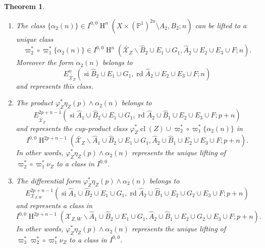 \documentclass[11pt,a4paper]{amsart}
\renewcommand{\P}{\mathds{P}}
\newcommand{\caX}{\mathcal{X}}
\DeclareMathOperator{\si}{si}
\DeclareMathOperator{\rd}{rd}
\DeclareMathOperator {\cl}{cl}
\DeclareMathOperator{\rH}{H}
\numberwithin{equation}{section}
\theoremstyle{plain}
\newtheorem{thm}[prop]{Theorem}
\theoremstyle{definition}
\begin{document}
\begin{thm}
\begin{enumerate}
  Moreover $\eta_{Z}$ satisfies  
  \begin{displaymath}
    \phi^{\ast}_{Z}\eta_{Z}(p) \in E^{2p-1}_{\widetilde {\caX_{Z}}}(\si
    \widehat A_1\cup E_1\cup E_2\cup E_3\cup F\cup G_1,\rd \widehat B_1;p)
  \end{displaymath}
  and represents the class $\varphi^{\ast}\cl(Z)$.
\item \label{item:6}The class $\{\alpha _2(n)\}\in I^{0,0}\rH^n (X\times
  (\P^1)^{2n}\setminus A_2,B_2;n)$ can be lifted to a unique class
  \begin{displaymath}
    \varpi _2^\ast\circ \varpi _1^\ast \{\alpha_2(n)\}\in
    I^{0,0}\rH^n(\widetilde {\caX_{Z}}\smallsetminus
    \widehat B_2\cup E_1\cup G_1, \widehat A_2\cup E_2\cup E_3\cup F;n).
  \end{displaymath}
  Moreover the form $\alpha _{2}(n)$ belongs to 
  \begin{displaymath}
    E^n_{\widetilde {\caX_{Z}}}(\si
    \widehat B_2\cup E_1\cup G_1, \rd \widehat A_2\cup E_2\cup E_3\cup F;n)
  \end{displaymath}
  and represents this class.
\item \label{item:7}The product
  $\varphi_{Z}^{\ast}\eta_Z(p)\wedge \alpha _2(n)$
  belongs to
  \begin{displaymath}
    E^{2p+n-1}_{\widetilde {\caX_{Z}}}(\si \widehat A_1\cup
    \widehat B_2\cup E_1\cup G_1   , \rd \widehat A_2\cup
    \widehat B_1\cup E_2\cup E_3\cup F;p+n)
  \end{displaymath}
  and  represents the cup-product class
  $\varphi_{Z}^{\ast}\cl(Z)\cup \varpi _2^\ast\circ \varpi _1^\ast
  \{\alpha_2(n)\}$ in
  \begin{displaymath}
     I^{0,0}\rH^{2p+n-1}(\widetilde {\caX_{Z}}\smallsetminus \widehat A_1\cup
    \widehat B_2\cup E_1\cup G_1   , \widehat A_2\cup
    \widehat B_1\cup E_2\cup E_3\cup F;p+n).
  \end{displaymath}
  In other words, $\varphi_{Z}^{\ast}\eta_Z(p)\wedge \alpha _2(n)$ represents
  the unique lifting of $\varpi _{2}^{\ast}\circ \varpi _{1}^{\ast}\nu
  _{Z}$ to a class in $I^{0,0}$. 
\item \label{item:8} The differential form
 $\varphi_{Z}^{\ast}\eta_Z(p)\wedge \alpha _2(n)$
  belongs to 
  \begin{displaymath}
    E^{2p+n-1}_{\caX_{Z,W}}(\si \widehat A_1\cup
    \widehat B_2\cup E_1\cup G_1   , \rd \widehat A_2\cup
    \widehat B_1\cup E_2\cup G_2\cup E_3\cup F;p+n)
  \end{displaymath}
  and  represents a class in 
  \begin{displaymath}
     I^{0,0}\rH^{2p+n-1}(\caX_{Z,W}\smallsetminus \widehat A_1\cup
    \widehat B_2\cup E_1\cup G_1   , \widehat A_2\cup
    \widehat B_1\cup E_2\cup G_2\cup E_3\cup F;p+n).
  \end{displaymath}
    In other words, $\varphi_{Z}^{\ast}\eta_Z(p)\wedge \alpha _2(n)$ represents
  the unique lifting of $\varpi _{3}^{\ast}\varpi _{2}^{\ast}\circ
  \varpi _{1}^{\ast}\nu _{Z}$ to a class in $I^{0,0}$. 
  \end{enumerate}
\end{thm}
\end{document}
